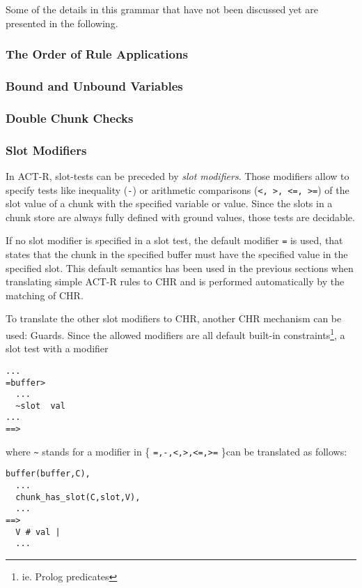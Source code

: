 Some of the details in this grammar that have not been discussed yet are presented in the following.

\subsubsection{The Order of Rule Applications}

\subsubsection{Bound and Unbound Variables}

\subsubsection{Double Chunk Checks}


\subsubsection{Slot Modifiers}

In ACT-R, slot-tests can be preceded by \emph{slot modifiers}. Those modifiers allow to specify tests like inequality (\verb|-|) or arithmetic comparisons (\verb|<, >, <=, >=|) of the slot value of a chunk with the specified variable or value. Since the slots in a chunk store are always fully defined with ground values, those tests are decidable.

If no slot modifier is specified in a slot test, the default modifier \verb|=| is used, that states that the chunk in the specified buffer must have the specified value in the specified slot. This default semantics has been used in the previous sections when translating simple ACT-R rules to CHR and is performed automatically by the matching of CHR.

To translate the other slot modifiers to CHR, another CHR mechanism can be used: Guards. Since the allowed modifiers are all default built-in constraints\footnote{ie. Prolog predicates}, a slot test with a modifier

\begin{lstlisting}
...
=buffer>
  ...
  ~slot  val
...
==>
\end{lstlisting}

where \verb|~| stands for a modifier in \{ \verb|=,-,<,>,<=,>=| \}can be translated as follows:

\begin{lstlisting}
buffer(buffer,C),
  ...
  chunk_has_slot(C,slot,V),
  ...
==>
  V # val |
  ...
\end{lstlisting}

